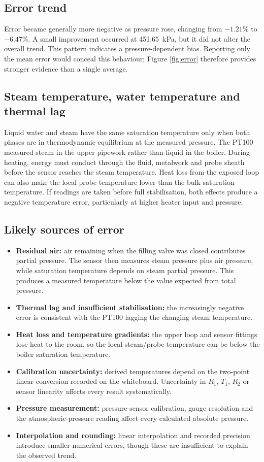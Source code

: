 \documentclass[11pt,a4paper]{article}
\begin{document}
\subsection{Error trend}
Error became generally more negative as pressure rose, changing from $-1.21\%$
to $-6.47\%$. A small improvement occurred at \SI{451.65}{\kilo\pascal}, but it
did not alter the overall trend. This pattern indicates a pressure-dependent
bias. Reporting only the mean error would conceal this behaviour; Figure
\ref{fig:error} therefore provides stronger evidence than a single average.

\subsection{Steam temperature, water temperature and thermal lag}
Liquid water and steam have the same saturation temperature only when both
phases are in thermodynamic equilibrium at the measured pressure. The PT100
measured steam in the upper pipework rather than liquid in the boiler. During
heating, energy must conduct through the fluid, metalwork and probe sheath before
the sensor reaches the steam temperature. Heat loss from the exposed loop can
also make the local probe temperature lower than the bulk saturation
temperature. If readings are taken before full stabilisation, both effects
produce a negative temperature error, particularly at higher heater input and
pressure.

\subsection{Likely sources of error}
\begin{itemize}
  \item \textbf{Residual air:} air remaining when the filling valve was closed
  contributes partial pressure. The sensor then measures steam pressure plus air
  pressure, while saturation temperature depends on steam partial pressure.
  This produces a measured temperature below the value expected from total pressure.
  \item \textbf{Thermal lag and insufficient stabilisation:} the increasingly
  negative error is consistent with the PT100 lagging the changing steam temperature.
  \item \textbf{Heat loss and temperature gradients:} the upper loop and sensor
  fittings lose heat to the room, so the local steam/probe temperature can be
  below the boiler saturation temperature.
  \item \textbf{Calibration uncertainty:} derived temperatures depend on the
  two-point linear conversion recorded on the whiteboard. Uncertainty in
  $R_1$, $T_1$, $R_2$ or sensor linearity affects every result systematically.
  \item \textbf{Pressure measurement:} pressure-sensor calibration, gauge
  resolution and the atmospheric-pressure reading affect every calculated
  absolute pressure.
  \item \textbf{Interpolation and rounding:} linear interpolation and recorded
  precision introduce smaller numerical errors, though these are insufficient
  to explain the observed trend.
\end{itemize}
\end{document}
